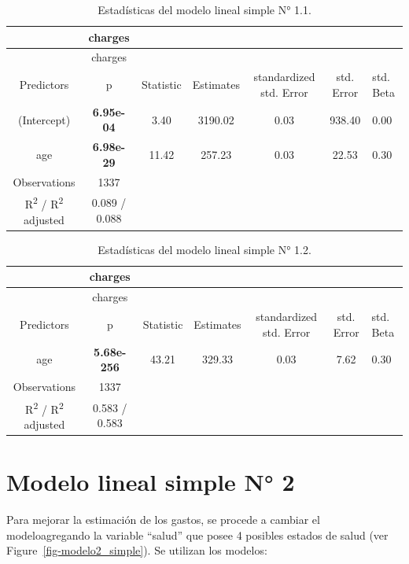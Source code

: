 \documentclass[
  letterpaper,
]{book}
\begin{document}
\hypertarget{tbl-stats_modelo1.1_simple}{}
\begin{longtable}[]{@{}ccccccl@{}}
\caption{\label{tbl-stats_modelo1.1_simple}Estadísticas del modelo
lineal simple N° 1.1.}\tabularnewline
\toprule()
~ & charges & & & & & \\
\midrule()
\endfirsthead
\toprule()
~ & charges & & & & & \\
\midrule()
\endhead
Predictors & p & Statistic & Estimates & standardized std. Error & std.
Error & std. Beta \\
(Intercept) & \textbf{6.95e-04} & 3.40 & 3190.02 & 0.03 & 938.40 &
0.00 \\
age & \textbf{6.98e-29} & 11.42 & 257.23 & 0.03 & 22.53 & 0.30 \\
Observations & 1337 & & & & & \\
R\textsuperscript{2} / R\textsuperscript{2} adjusted & 0.089 / 0.088 & &
& & & \\
\bottomrule()
\end{longtable}

\hypertarget{tbl-stats_modelo1.2_simple}{}
\begin{longtable}[]{@{}ccccccl@{}}
\caption{\label{tbl-stats_modelo1.2_simple}Estadísticas del modelo
lineal simple N° 1.2.}\tabularnewline
\toprule()
~ & charges & & & & & \\
\midrule()
\endfirsthead
\toprule()
~ & charges & & & & & \\
\midrule()
\endhead
Predictors & p & Statistic & Estimates & standardized std. Error & std.
Error & std. Beta \\
age & \textbf{5.68e-256} & 43.21 & 329.33 & 0.03 & 7.62 & 0.30 \\
Observations & 1337 & & & & & \\
R\textsuperscript{2} / R\textsuperscript{2} adjusted & 0.583 / 0.583 & &
& & & \\
\bottomrule()
\end{longtable}

\hypertarget{modelo-lineal-simple-n-2}{%
\section*{Modelo lineal simple N° 2}\label{modelo-lineal-simple-n-2}}

Para mejorar la estimación de los gastos, se procede a cambiar el
modeloagregando la variable ``salud'' que posee 4 posibles estados de
salud (ver Figure~\ref{fig-modelo2_simple}). Se utilizan los modelos:
\end{document}
